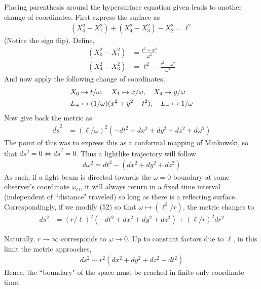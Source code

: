\documentclass[10pt]{scrartcl}
\begin{document}
Placing parenthesis around the hypersurface equation given leads to another change of coordinates. First express the surface as
\begin{align}
	(X_0^2 - X_1^2) + (X_4^2 - X_3^2) - X_2^2 = \ell^2
\end{align}
(Notice the sign flip). Define,
\begin{align}
	(X_0^2 - X_1^2) &= \frac{t^2 - x^2}{\omega^2}\\
	(X_4^2 - X_3^2) &= \ell^2 - \frac{t^2-x^2}{\omega^2}
\end{align}
And now apply the following change of coordinates,
\begin{align}
&X_0\mapsto t/\omega\qcomma X_1\mapsto x/\omega\qcomma X_4\mapsto y/\omega	\\
&L_+ \mapsto (1/\omega)(x^2 + y^2 - t^2)\qcomma L_- \mapsto 1/\omega 	
\end{align}
Now give back the metric as 
\begin{align}
 \bar{ds}^2 &= (\ell/\omega)^2(-dt^2 + dx^2 + dy^2 + dz^2 + d\omega^2) 
\end{align}
The point of this was to express this as a conformal mapping of Minkowski, so that $ds^2 = 0 \iff \bar{ds}^2 = 0$. Thus a lightlike trajectory will follow
\begin{align}
d\omega^2 = dt^2 - (dx^2 + dy^2 + dz^2)	
\end{align}
As such, if a light beam is directed towards the $\omega=0$ boundary at some observer's coordinate $\omega_O$, it will always return in a fixed time interval (independent of ``distance" traveled) so long as there is a reflecting surface. Correspondingly, if we modify (52) so that $\omega\mapsto (\ell^2/r)$, the metric changes to
\begin{align}
ds^2 &= (r/\ell)^2(-dt^2 + dx^2 + dy^2 + dz^2) + (\ell/r)^2dr^2	
\end{align}

Naturally, $r\to\infty$ corresponds to $\omega\to 0$.  Up to constant factors due to $\ell$, in this limit the metric approaches,
\begin{align}
	ds^2\sim r^2(dx^2 + dy^2 + dz^2 - dt^2)
\end{align}
Hence, the ``boundary" of the space must be reached in finite-only coordinate time. 
\end{document}

